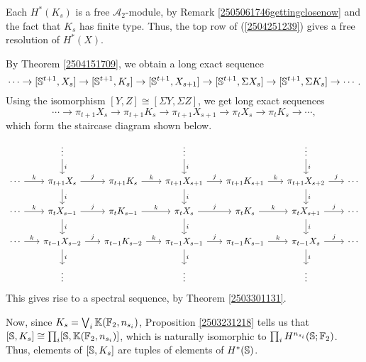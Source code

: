 \documentclass[11pt, titlepage]{article} %
\def\bb{\ensuremath\mathbb}
\def\A{\ensuremath{\mathscr{A}_2}}
\numberwithin{equation}{subsection}
\theoremstyle{plain}
\theoremstyle{definition}
\begin{document}
Each \(H^*(K_s)\) is a free \(\A\)-module, by Remark \ref{2505061746gettingclosenow} and the fact that \(K_s\) has finite type. Thus, the top row of (\ref{2504251239}) gives a free resolution of \(H^*(X)\). 


By Theorem \ref{2504151709}, we obtain a long exact sequence
\[\cdots \to [\bb{S}^{t+1}, X_s] \to [\bb{S}^{t+1}, K_s] \to [\bb{S}^{t+1}, X_{s+1}]\to [\bb{S}^{t+1}, \Sigma X_s]\to [\bb{S}^{t+1}, \Sigma K_s] \to \cdots.\]
Using the isomorphism \([Y,Z]\cong [\Sigma Y, \Sigma Z]\), we get long exact sequences
\[\cdots \to \pi_{t+1}X_s \to \pi_{t+1}K_s \to \pi_{t+1}X_{s+1}\to \pi_t X_s\to \pi_t K_s \to \cdots,\]
which form the staircase diagram shown below.
\begin{equation}\label{2504201907}
\begin{tikzcd}[column sep=4ex, row sep=4ex]
   &  \vdots \arrow[d, "i"] &  & \vdots \arrow[d, "i"] &  & \vdots \arrow[d, "i"] & \\
 \cdots \arrow[r, "k"] & \pi_{t+1}X_s \arrow[d, "i"] \arrow[r, "j"] & \pi_{t+1}K_s  \arrow[r, "k"] & \pi_{t+1}X_{s+1} \arrow[d, "i"] \arrow[r, "j"] & \pi_{t+1}K_{s+1} \arrow[r, "k"] & \pi_{t+1}X_{s+2} \arrow[d, "i"] \arrow[r, "j"] & \cdots \\
 \cdots \arrow[r, "k"] & \pi_t X_{s-1} \arrow[d, "i"] \arrow[r, "j"] & \pi_t K_{s-1}  \arrow[r, "k"] & \pi_t X_s \arrow[d, "i"] \arrow[r, "j"] & \pi_t K_s \arrow[r, "k"] & \pi_t X_{s+1} \arrow[d, "i"] \arrow[r, "j"] & \cdots \\
 \cdots \arrow[r, "k"] & \pi_{t-1}X_{s-2}  \arrow[d, "i"] \arrow[r, "j"] & \pi_{t-1}K_{s-2}  \arrow[r, "k"] & \pi_{t-1}X_{s-1} \arrow[d, "i"] \arrow[r, "j"] & \pi_{t-1}K_{s-1} \arrow[r, "k"] & \pi_{t-1}X_s \arrow[d, "i"] \arrow[r, "j"] & \cdots \\
 & \vdots &  & \vdots & & \vdots &
\end{tikzcd}
\end{equation}
This gives rise to a spectral sequence, by Theorem \ref{2503301131}.

Now, since \(K_s = \bigvee_i \bb{K}(\bb{F}_2, n_{s_i})\), Proposition \ref{2503231218} tells us that \([\bb{S}, K_s]\cong \prod_i[\bb{S}, \bb{K}(\bb{F}_2, n_{s_i})]\), which is naturally isomorphic to \(\prod_i H^{n_{s_i}}(\bb{S}; \bb{F}_2)\). Thus, elements of \([\bb{S}, K_s]\) are tuples of elements of \(H^*(\bb{S})\).
\end{document}
